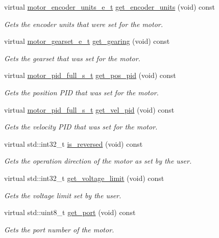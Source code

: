 \begin{DoxyCompactItemize}
virtual \hyperlink{motors_8h_a6677ba23760c558fd8b7b4e1e00a6123}{motor\+\_\+encoder\+\_\+units\+\_\+e\+\_\+t} \hyperlink{classpros_1_1Motor_a9fd37f3efa2f903bda8bf575b0052fd2}{get\+\_\+encoder\+\_\+units} (void) const
\begin{DoxyCompactList}\small\item\em Gets the encoder units that were set for the motor. \end{DoxyCompactList}\item 
virtual \hyperlink{motors_8h_aa2f1c305c998abc3bf8dd1f76fa4da8b}{motor\+\_\+gearset\+\_\+e\+\_\+t} \hyperlink{classpros_1_1Motor_a3227bc4fbe531638472fff4dfb134333}{get\+\_\+gearing} (void) const
\begin{DoxyCompactList}\small\item\em Gets the gearset that was set for the motor. \end{DoxyCompactList}\item 
virtual \hyperlink{motors_8h_a0295cbf49f5c70c17b5fa962bd25febd}{motor\+\_\+pid\+\_\+full\+\_\+s\+\_\+t} \hyperlink{classpros_1_1Motor_a32193b8d020ad1b47e1cb9f0b74a6c7d}{get\+\_\+pos\+\_\+pid} (void) const
\begin{DoxyCompactList}\small\item\em Gets the position P\+ID that was set for the motor. \end{DoxyCompactList}\item 
virtual \hyperlink{motors_8h_a0295cbf49f5c70c17b5fa962bd25febd}{motor\+\_\+pid\+\_\+full\+\_\+s\+\_\+t} \hyperlink{classpros_1_1Motor_a2b939563c3b915d7b8ce3dd1dece6208}{get\+\_\+vel\+\_\+pid} (void) const
\begin{DoxyCompactList}\small\item\em Gets the velocity P\+ID that was set for the motor. \end{DoxyCompactList}\item 
virtual std\+::int32\+\_\+t \hyperlink{classpros_1_1Motor_a5122faa60ef7745761eca847192560c5}{is\+\_\+reversed} (void) const
\begin{DoxyCompactList}\small\item\em Gets the operation direction of the motor as set by the user. \end{DoxyCompactList}\item 
virtual std\+::int32\+\_\+t \hyperlink{classpros_1_1Motor_a2afbe15bed764ca6d21f1e7c6c8da700}{get\+\_\+voltage\+\_\+limit} (void) const
\begin{DoxyCompactList}\small\item\em Gets the voltage limit set by the user. \end{DoxyCompactList}\item 
virtual std\+::uint8\+\_\+t \hyperlink{classpros_1_1Motor_a5b0e644c8af396a6af8142b41d1bc7b6}{get\+\_\+port} (void) const
\begin{DoxyCompactList}\small\item\em Gets the port number of the motor. \end{DoxyCompactList}\end{DoxyCompactItemize}
